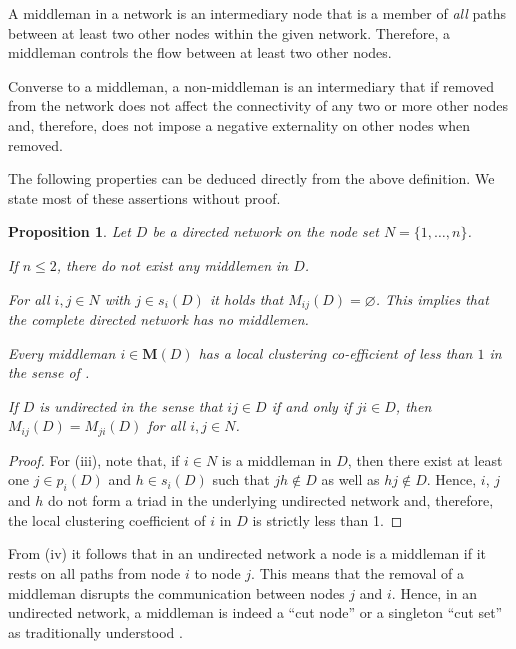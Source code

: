 \documentclass[11pt,fleqn]{article}
\newcounter{llst}
\newenvironment{numm}{\begin{list}{\rm (\roman{llst})}{\usecounter{llst}
\setlength{\itemindent}{0em} \setlength{\leftmargin}{3.5em}
\setlength{\labelwidth}{2.5em} \setlength{\labelsep}{1em}}}{\end{list}}
\newtheorem{proposition}[theorem]{Proposition}
\begin{document}
\noindent
A middleman in a network is an intermediary node that is a member of \emph{all} paths between at least two other nodes within the given network. Therefore, a middleman controls the flow between at least two other nodes.

Converse to a middleman, a non-middleman is an intermediary that if removed from the network does not affect the connectivity of any two or more other nodes and, therefore, does not impose a negative externality on other nodes when removed.

The following properties can be deduced directly from the above definition. We state most of these assertions without proof.

\begin{proposition}\label{TheoremIntermediary}
Let $D$ be a directed network on the node set $N = \{ 1, \ldots ,n \}$.
\begin{numm}
	\item If $n \leqslant 2$, there do not exist any middlemen in $D$.
	\item For all $i,j \in N$ with $j \in s_{i}(D)$ it holds that $M_{ij}(D) = \varnothing$. This implies that the complete directed network has no middlemen.
	\item Every middleman $i \in \mathbf M(D)$ has a local clustering co-efficient of less than $1$ in the sense of \citet[Sections 2.10 and 3.9]{Barabasi2016}.
	\item If $D$ is undirected in the sense that $ij \in D$ if and only if $ji \in D$, then $M_{ij} (D) = M_{ji} (D)$ for all $i,j \in N$.
\end{numm}
\end{proposition}

\begin{proof}
	For (iii), note that, if $i \in N$ is a middleman in $D$, then there exist at least one $j \in p_i (D)$ and $h \in s_i (D)$ such that $jh \notin D$ as well as $hj \notin D$. Hence, $i$, $j$ and $h$ do not form a triad in the underlying undirected network and, therefore, the local clustering coefficient of $i$ in $D$ is strictly less than 1.
\end{proof}

\noindent
From (iv) it follows that in an undirected network a node is a middleman if it rests on all paths from node $i$ to node $j$. This means that the removal of a middleman disrupts the communication between nodes $j$ and $i$. Hence, in an undirected network, a middleman is indeed a ``cut node'' or a singleton ``cut set'' as traditionally understood \citep[\S 5]{Wilson2010}.
\end{document}
